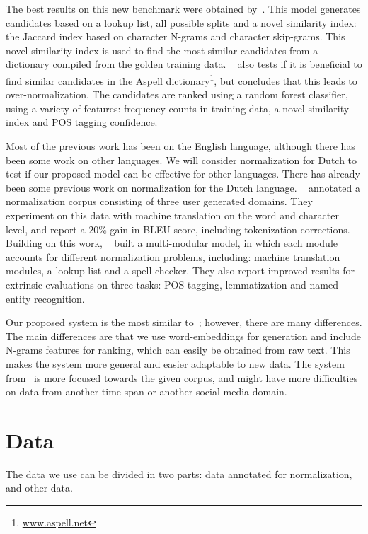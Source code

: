 \documentclass[a4paper,10pt,twoside]{article}
\begin{document}
The best results on this new benchmark were obtained
by~. This model generates candidates based on a
lookup list, all possible splits and a novel similarity index: the Jaccard
index based on character N-grams and character skip-grams. This novel
similarity index is used to find the most similar candidates from a dictionary
compiled from the golden training data. ~ also tests
if it is beneficial to find similar candidates in the Aspell
dictionary\footnote{\url{www.aspell.net}}, but concludes that this leads to
over-normalization.  The candidates are ranked using a random forest
classifier, using a variety of features: frequency counts in training data, a
novel similarity index and POS tagging confidence. 

Most of the previous work has been on the English language, although there has
been some work on other languages. We will consider normalization for Dutch to
test if our proposed model can be effective for other languages.  There has
already been some previous work on normalization for the Dutch language.
~ annotated a normalization corpus consisting of three
user generated domains. They experiment on this data with machine translation
on the word and character level, and report a 20\% gain in BLEU score,
including tokenization corrections.  Building on this work,
~ built a multi-modular model, in
which each module accounts for different normalization problems, including:
machine translation modules, a lookup list and a spell checker. They also
report improved results for extrinsic evaluations on three tasks: POS tagging,
lemmatization and named entity recognition.

Our proposed system is the most similar to~; however,
there are many differences. The main differences are that we use
word-embeddings for generation and include N-grams features for ranking, which
can easily be obtained from raw text. This makes the system more general and
easier adaptable to new data. The system from~ is
more focused towards the given corpus, and might have more difficulties on data
from another time span or another social media domain.
 
\section{Data}
\label{sec:data}
The data we use can be divided in two parts: data annotated for normalization, and 
other data.
\end{document}
